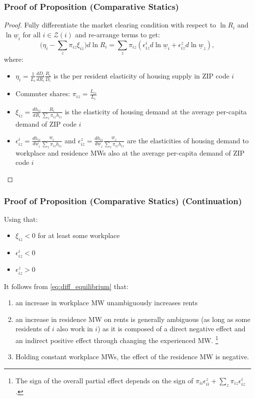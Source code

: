 \documentclass[aspectratio=169, t]{beamer}
\newcommand{\Z}{\mathcal{Z}}
\newcommand{\MW}{\underline{w}}
\begin{document}
\begin{frame}[label = proof_comp_stat]
\frametitle{Proof of Proposition (Comparative Statics)}

\begin{proof}
    Fully differentiate the market clearing condition with respect to $\ln R_i$ and 
    $\ln \MW_i$ for all $i\in\Z(i)$ and re-arrange terms to get:
    \begin{equation}\label{eq:diff_equilibrium}
        \Big(\eta_i - \sum_z \pi_{iz} \xi_{iz} \Big) d \ln R_i
        = 
        \sum_z \pi_{iz} \left(\epsilon_{iz}^i d \ln \MW_i 
                            + \epsilon_{iz}^z d \ln \MW_z \right) ,
    \end{equation}
    where:
    \begin{itemize}
        \item $\eta_i = \frac{1}{L_i} \frac{d D_i}{d R_i} \frac{R_i}{D_i}$ is the per resident elasticity 
        of housing supply in ZIP code $i$
        \item Commuter shares: $\pi_{iz} = \frac{L_{iz}}{L_i}$
        \item $\xi_{iz} = \frac{d h_{iz}}{d R_i} \frac{R_i}{\sum_z \pi_{iz} h_{iz}}$ is the 
        elasticity of housing demand at the average per-capita demand of ZIP code $i$
        \item  $\epsilon_{iz}^i = \frac{d h_{iz}}{d \MW_i} \frac{\MW_i}{\sum_z \pi_{iz} h_{iz}}$ and 
        $\epsilon_{iz}^z = \frac{d h_{iz}}{d \MW_z} \frac{\MW_z}{\sum_z \pi_{iz} h_{iz}}$ 
        are the elasticities of housing demand to workplace and residence MWs also at
         the average per-capita demand of ZIP code $i$
    \end{itemize}
\end{proof}
\end{frame}

\begin{frame}
    \frametitle{Proof of Proposition (Comparative Statics) (Continuation)}
    
    Using that:
    \begin{itemize} 
        \item $\xi_{iz} < 0$ for at least some workplace
        \item $\epsilon_{iz}^i < 0$
        \item $\epsilon_{iz}^z > 0$
    \end{itemize}
    It follows from \eqref{eq:diff_equilibrium} that:
    \begin{enumerate}
        \item an increase in workplace MW unambiguously increases rents
        \item an increase in residence MW on rents is generally ambiguous 
        (as long as some residents of $i$ also work in $i$) as it is composed of a direct negative 
        effect and an indirect positive effect through changing the experienced MW. \footnote{The sign of the overall partial effect depends on the sign of 
    $\pi_{ii} \epsilon_{ii}^z + \sum_z \pi_{iz} \epsilon_{iz}^i$.}
        \item Holding constant workplace MWs, the effect of the residence MW is negative.
    \end{enumerate}    
\end{frame}
\end{document}

